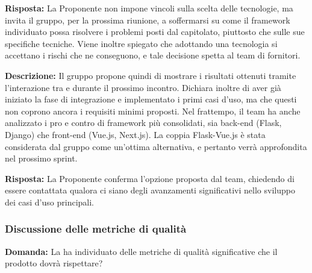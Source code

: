 \par \textbf{Risposta:} La Proponente non impone vincoli sulla scelta delle tecnologie, ma invita il gruppo, per la prossima riunione, a soffermarsi su come il framework individuato possa risolvere i problemi posti dal capitolato, piuttosto che sulle sue specifiche tecniche. Viene inoltre spiegato che adottando una tecnologia si accettano i rischi che ne conseguono, e tale decisione spetta al team di fornitori.

\par \textbf{Descrizione:} Il gruppo propone quindi di mostrare i risultati ottenuti tramite l'interazione tra  e  durante il prossimo incontro. Dichiara inoltre di aver già iniziato la fase di integrazione e implementato i primi casi d’uso, ma che questi non coprono ancora i requisiti minimi proposti. Nel frattempo, il team ha anche analizzato i pro e contro di framework più consolidati, sia back-end (Flask, Django) che front-end (Vue.js, Next.js). La coppia Flask-Vue.js è stata considerata dal gruppo come un’ottima alternativa, e pertanto verrà approfondita nel prossimo sprint.

\par \textbf{Risposta:} La Proponente conferma l'opzione proposta dal team, chiedendo di essere contattata qualora ci siano degli avanzamenti significativi nello sviluppo dei casi d'uso principali.

\subsubsection{Discussione delle metriche di qualità}

\par \textbf{Domanda:} La  ha individuato delle metriche di qualità significative che il prodotto dovrà rispettare?


